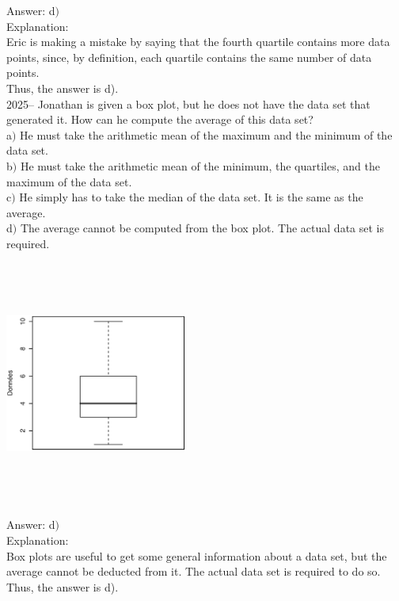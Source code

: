 \documentclass[letterpaper, 12pt]{article}
\begin{document}
Answer: d$)$\\

Explanation:\\
Eric is making a mistake by saying that the fourth quartile contains more data points, since, by definition, each quartile contains the same number of data points. \\
Thus, the answer is d).\\

2025-- Jonathan is given a box plot, but he does not have the data set that generated it. How can he compute the average of this data set?\\

a$)$ He must take the arithmetic mean of the maximum and the minimum of the data set.\\
b$)$ He must take the arithmetic mean of the minimum, the quartiles, and the maximum of the data set. \\
c$)$ He simply has to take the median of the data set. It is the same as the average.\\
d$)$ The average cannot be computed from the box plot. The actual data set is required.\\
\begin{center}
 \includegraphics[width=6cm,height=8cm,angle=-90]{Q2024.eps}
\end{center}

Answer: d$)$\\

Explanation:\\
Box plots are useful to get some general information about a data set, but the average cannot be deducted from it. The actual data set is required to do so.\\
Thus, the answer is d).\\
\end{document}
